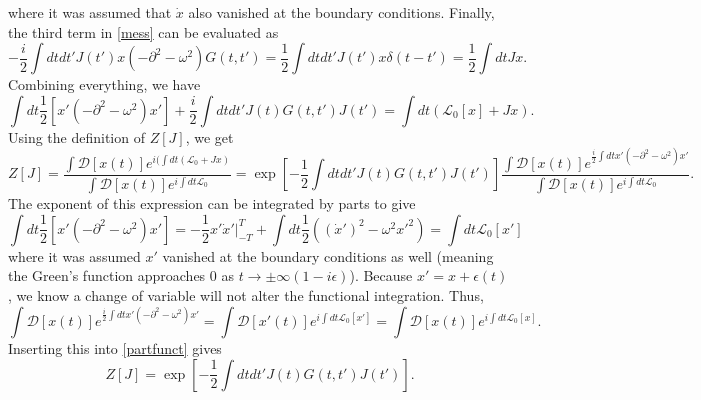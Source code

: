 where it was assumed that $\dot x$ also vanished at the boundary conditions. Finally, the third term in \eqref{mess} can be evaluated as 
\begin{equation}
    -\frac i 2 \int dtdt'J(t')x(-\partial^2-\omega^2)G(t,t')=\frac 1 2 \int dtdt'J(t')x\delta(t-t')=\frac 1 2 \int dt Jx.
\end{equation}
Combining everything, we have
\begin{equation}
    \int dt \frac 1 2 [x'(-\partial^2-\omega^2)x']+\frac i 2 \int dt dt' J(t)G(t,t')J(t')=\int dt (\mathcal L_0[x]+Jx).
\end{equation}
Using the definition of $Z[J]$, we get
\begin{equation}
    \label{partfunct}
    Z[J]=\frac{\int \mathcal D[x(t)] e^{i(\int dt(\mathcal L_0+Jx)}}{\int \mathcal D[x(t)]e^{i\int dt \mathcal L_0}}=\exp[-\frac 1 2 \int dtdt'J(t)G(t,t')J(t')]\frac{\int \mathcal D[x(t)] e^{\frac i 2\int dtx'(-\partial^2-\omega^2)x'}}{\int \mathcal D[x(t)]e^{i\int dt \mathcal L_0}}. 
\end{equation}
The exponent of this expression can be integrated by parts to give
\begin{equation}
    \int dt \frac 1 2 [x'(-\partial^2-\omega^2)x']=-\frac 1 2 x'\dot x'|_{-T}^T+\int dt \frac 1 2 ((\dot x')^2-\omega^2x'^2)=\int dt \mathcal L_0 [x']
\end{equation}
where it was assumed $x'$ vanished at the boundary conditions as well (meaning the Green's function approaches $0$ as $t\to \pm \infty(1-i\epsilon)$). Because $x'=x+\epsilon(t)$, we know a change of variable will not alter the functional integration. Thus,
\begin{equation}
    \int \mathcal D[x(t)] e^{\frac i 2\int dtx'(-\partial^2-\omega^2)x'}=\int \mathcal D[x'(t)] e^{ i \int dt\mathcal L_0[x']}=\int \mathcal D[x(t)] e^{ i \int dt\mathcal L_0[x]}.
\end{equation}
Inserting this into \eqref{partfunct} gives
\begin{equation}
    Z[J]=\exp[-\frac 1 2 \int dtdt'J(t)G(t,t')J(t')].
\end{equation}

